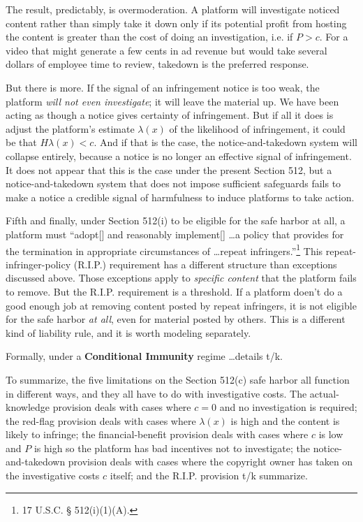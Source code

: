 The result, predictably, is overmoderation. A platform will investigate noticed content rather than simply take it down  only if its potential profit from hosting the content is greater than the cost of doing an investigation, i.e. if $P > c$. For a video that might generate a few cents in ad revenue but would take several dollars of employee time to review, takedown is the preferred response. 

But there is more. If the signal of an infringement notice is too weak, the platform \emph{will not even investigate}; it will leave the material up. We have been acting as though a notice gives certainty of infringement. But if all it does is adjust the platform's estimate $\lambda(x)$ of the likelihood of infringement, it could be that $H\lambda(x) < c$. And if that is the case, the notice-and-takedown system will collapse entirely, because a notice is no longer an effective signal of infringement. It does not appear that this is the case under the present Section 512, but a notice-and-takedown system that does not impose sufficient safeguards fails to make a notice a credible signal of harmfulness to induce platforms to take action.

Fifth and finally, under Section 512(i) to be eligible for the safe harbor at all, a platform must ``adopt[] and reasonably implement[] \ldots a policy that provides for the termination in appropriate circumstances of \ldots repeat infringers.''\footnote{17 U.S.C. § 512(i)(1)(A).} This repeat-infringer-policy (R.I.P.) requirement has a different structure than exceptions discussed above. Those exceptions apply to \emph{specific content} that the platform fails to remove. But the R.I.P. requirement is a threshold. If a platform doen't do a good enough job at removing content posted by repeat infringers, it is not eligible for the safe harbor \emph{at all}, even for material posted by others. This is a different kind of liability rule, and it is worth modeling separately. 

Formally, under a \textbf{Conditional Immunity} regime \ldots details t/k.

To summarize, the five limitations on the Section 512(c) safe harbor all function in different ways, and they all have to do with investigative costs. The actual-knowledge provision deals with cases where $c = 0$ and no investigation is required; the red-flag provision deals with cases where $\lambda(x)$ is high and the content is likely to infringe; the financial-benefit provision deals with cases where $c$ is low and $P$ is high so the platform has bad incentives not to investigate; the notice-and-takedown provision deals with cases where the copyright owner has taken on the investigative costs $c$ itself; and the R.I.P. provision t/k summarize.

